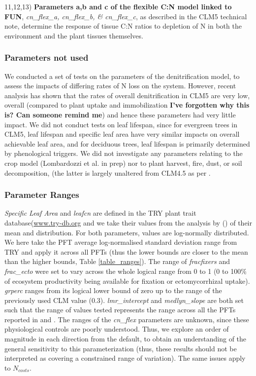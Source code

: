 \documentclass[draft,linenumbers]{agujournal}
\begin{document}
11,12,13) \textbf{Parameters a,b and c of the flexible C:N model linked to FUN}, \emph{cn\_flex\_a, cn\_flex\_b, \& cn\_flex\_c}, as described in the CLM5 technical note, determine the response of tissue C:N ratios to depletion of N in both the environment and the plant tissues themselves.


\subsubsection{Parameters not used}

We conducted a set of tests on the parameters of the denitrification model, to assess the impacts of differing rates of N loss on the system. However, recent analysis has shown that the rates of overall denitrification in CLM5 are very low, overall (compared to plant uptake and immobilization \textbf{I've forgotten why this is? Can someone remind me}) and hence these parameters had very little impact. We did not conduct tests on leaf lifespan, since for evergreen trees in CLM5, leaf lifespan and specific leaf area have very similar impacts on overall achievable leaf area, and for deciduous trees, leaf lifespan is primarily determined by phenological triggers. We did not investigate any parameters relating to the crop model (Lombardozzi et al. in prep) nor to plant harvest, fire, dust, or soil decomposition, (the latter is largely unaltered from CLM4.5 as per \cite{koven2013}.

\subsubsection{Parameter Ranges}

\emph{Specific Leaf Area} and \emph{leafcn} are defined in the TRY plant trait database(\url{www.try-db.org} and we take their values from the analysis by (\cite{kattge2011}) of their mean and distribution. For both parameters, values are log-normally distributed. We here take the PFT average log-normalised standard deviation range from TRY and apply it across all PFTs (thus the lower bounds are closer to the mean than the higher bounds, Table \ref{table_ranges}). The range of \emph{fracfixers} and \emph{frac\_ecto} were set to vary across the whole logical range from 0 to 1 (0 to 100\% of ecosystem productivity being available for fixation or ectomycorrhizal uptake). \emph{grperc} ranges from its logical lower bound of zero up to the range of the previously used CLM value (0.3). \emph{lmr\_intercept} and \emph{medlyn\_slope} are both set such that the range of values tested represents the range across all the PFTs reported in \cite{atkin2015} and \cite{dekauwe2015}. The ranges of the \emph{cn\_flex} parameters are unknown, since these physiological controls are poorly understood. Thus, we explore an order of magnitude in each direction from the default, to obtain an understanding of the general sensitivity to this parameterization (thus, these results should not be interpreted as covering a constrained range of variation). The same issues apply to $N_{costs}$.
\end{document}
